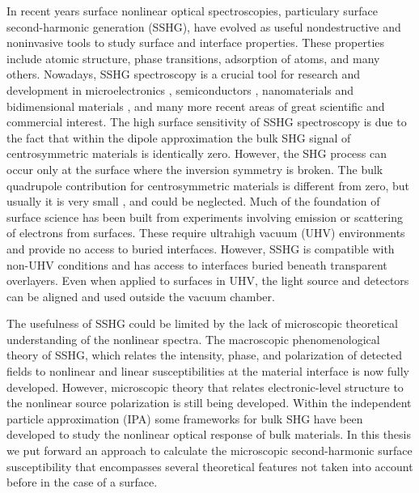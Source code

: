 In recent years surface nonlinear optical spectroscopies, particulary surface
second-harmonic generation (SSHG), have evolved as useful nondestructive and
noninvasive tools to study surface and interface properties. These properties
include atomic structure, phase transitions, adsorption of atoms, and many
others.\cite{daumPRL93, mcgilpOE94, meyerPRL95, powerPRL95, godefroyAPL96,
hoferAPA96, dadapPRB97, bloembergenAPB99, mcgilpSRL99, suzukiAPB99,
mitchellSS01, hughesPRB96, guyotPRB88, downerPSSA01, shenAPB99, shenNAT89,
chenPRL81, mendozaPRL98, downerSIA01} Nowadays, SSHG spectroscopy is a crucial
tool for research and development in microelectronics \cite{zheltikovLP00},
semiconductors \cite{lupkeSSR99}, nanomaterials and bidimensional materials
\cite{deanPRB14, malardPRB13}, and many more recent areas of great scientific
and commercial interest.\cite{cazzanelliNM14} The high surface sensitivity of
SSHG spectroscopy is due to the fact that within the dipole approximation the
bulk SHG signal of centrosymmetric materials is identically zero. However, the
SHG process can occur only at the surface where the inversion symmetry is
broken. The bulk quadrupole contribution for centrosymmetric materials is
different from zero, but usually it is very small \cite{downerSIA01}, and could
be neglected. Much of the foundation of surface science has been built from
experiments involving emission or scattering of electrons from surfaces. These
require ultrahigh vacuum (UHV) environments and provide no access to buried
interfaces. However, SSHG is compatible with non-UHV conditions and has access
to interfaces buried beneath transparent overlayers. Even when applied to
surfaces in UHV, the light source and detectors can be aligned and used outside
the vacuum chamber.

The usefulness of SSHG could be limited by the lack of microscopic theoretical
understanding of the nonlinear spectra. The macroscopic phenomenological theory
of SSHG, which relates the intensity, phase, and polarization of detected fields
to nonlinear and linear susceptibilities at the material interface is now fully
developed.\cite{downerSIA01} However, microscopic theory that relates
electronic-level structure to the nonlinear source polarization is still being
developed. \cite{butcherPOPS63, aspnesPRB72, sipePRB93, levinePRB94,
aversaPRB95, hughesPRB96, rashkeevPRB98, beyond,mendozaPRL98, arzatePRB01,
mendozaPRB01, mejiaPRB02, sanoPRB02, mejiaRMF04, trollePRB14} Within the
independent particle approximation (IPA) some frameworks for bulk SHG have been
developed to study the nonlinear optical response of bulk materials.
\cite{butcherPOPS63, aspnesPRB72, sipePRB93, levinePRB94,aversaPRB95,
hughesPRB96, rashkeevPRB98} In this thesis we put forward an approach to
calculate the microscopic second-harmonic surface susceptibility that
encompasses several theoretical features not taken into account before in the
case of a surface.

